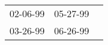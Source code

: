 \begin{supertabular}{lll}
 02-06-99\textsuperscript{} &  05-27-99\textsuperscript{} \\
 03-26-99\textsuperscript{} &  06-26-99\textsuperscript{} \\
\end{supertabular}
